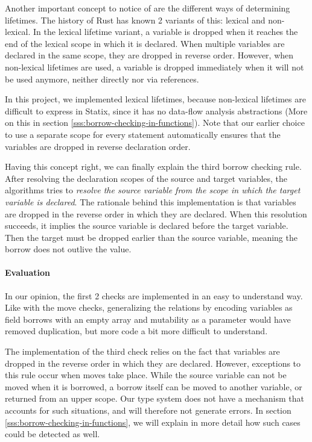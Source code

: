 Another important concept to notice of are the different ways of determining lifetimes. The history of Rust has known 2 variants of this: lexical and non-lexical. In the lexical lifetime variant, a variable is dropped when it reaches the end of the lexical scope in which it is declared. When multiple variables are declared in the same scope, they are dropped in reverse order. However, when non-lexical lifetimes are used, a variable is dropped immediately when it will not be used anymore, neither directly nor via references.

In this project, we implemented lexical lifetimes, because non-lexical lifetimes are difficult to express in Statix, since it has no data-flow analysis abstractions (More on this in section \ref{sss:borrow-checking-in-functions}). Note that our earlier choice to use a separate scope for every statement automatically ensures that the variables are dropped in reverse declaration order.

Having this concept right, we can finally explain the third borrow checking rule. After resolving the declaration scopes of the source and target variables, the algorithms tries to \textit{resolve the source variable from the scope in which the target variable is declared}. The rationale behind this implementation is that variables are dropped in the reverse order in which they are declared. When this resolution succeeds, it implies the source variable is declared before the target variable. Then the target must be dropped earlier than the source variable, meaning the borrow does not outlive the value.

\paragraph{Evaluation}

In our opinion, the first 2 checks are implemented in an easy to understand way. Like with the move checks, generalizing the relations by encoding variables as field borrows with an empty array and mutability as a parameter would have removed duplication, but more code a bit more difficult to understand.

The implementation of the third check relies on the fact that variables are dropped in the reverse order in which they are declared. However, exceptions to this rule occur when moves take place. While the source variable can not be moved when it is borrowed, a borrow itself can be moved to another variable, or returned from an upper scope. Our type system does not have a mechanism that accounts for such situations, and will therefore not generate errors. In section \ref{sss:borrow-checking-in-functions}, we will explain in more detail how such cases could be detected as well. 
